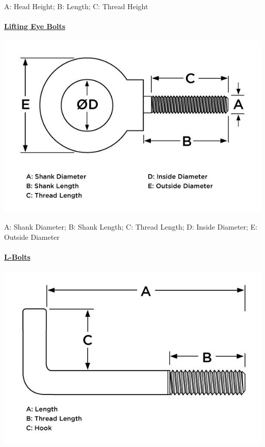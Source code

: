 \documentclass[12pt, a4paper]{article}
\let\oldparagraph\paragraph
\renewcommand{\paragraph}[1]{\oldparagraph{#1}\mbox{}}
\begin{document}
		\hypertarget{izm4mmm}{}
		A: Head Height; B: Length; C: Thread Height
		
		\hypertarget{igkw95g}{}
		\hypertarget{i5213mh}{%
			\paragraph{\texorpdfstring{\href{https://www.huyett.com/all-products/bolts/eye-bolts}{Lifting
						Eye Bolts}}{Lifting Eye Bolts}}\label{i5213mh}}
		
		\includegraphics{Introduction to Nut and Bolt Sizes_files/6307bcfa5c57d694202170.jpg}
		
		\hypertarget{ijtjve5}{}
		A: Shank Diameter; B: Shank Length; C: Thread Length; D: Inside
		Diameter; E: Outside Diameter
		
		\hypertarget{i9gqtac}{}
		\hypertarget{i8b9v29}{}
		\hypertarget{il3jc1y}{%
			\paragraph{\texorpdfstring{\href{https://www.huyett.com/product/search?search=l-bolt}{L-Bolts}}{L-Bolts}}\label{il3jc1y}}
		
		\includegraphics{Introduction to Nut and Bolt Sizes_files/6307bd9dd0447291869107.jpg}
		
\end{document}
